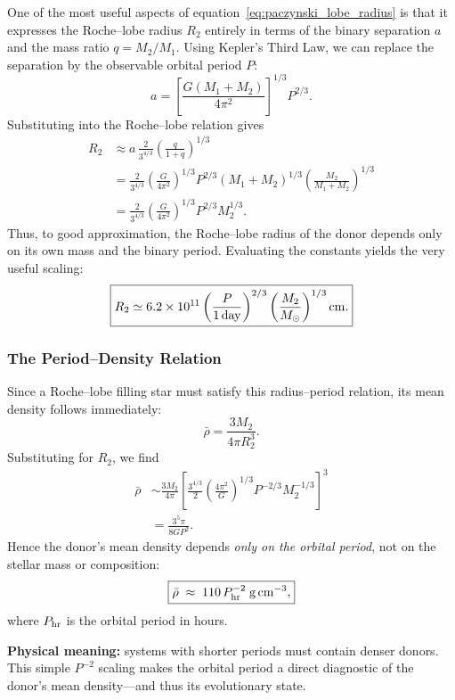 One of the most useful aspects of equation~\eqref{eq:paczynski_lobe_radius} is that it expresses the Roche–lobe radius $R_2$ entirely in terms of the binary separation $a$ and the mass ratio $q = M_2 / M_1$.  
Using Kepler’s Third Law, we can replace the separation by the observable orbital period $P$:
\begin{equation}
a = \left[\frac{G (M_1 + M_2)}{4\pi^2}\right]^{1/3} P^{2/3}.
\end{equation}
Substituting into the Roche–lobe relation gives
\begin{align}
R_2 &\approx a\,\frac{2}{3^{4/3}} \left(\frac{q}{1+q}\right)^{1/3} \\[4pt]
&= \frac{2}{3^{4/3}}\!\left(\frac{G}{4\pi^2}\right)^{1/3}
   P^{2/3} (M_1 + M_2)^{1/3}
   \left(\frac{M_2}{M_1 + M_2}\right)^{1/3} \\[4pt]
&= \frac{2}{3^{4/3}}\!\left(\frac{G}{4\pi^2}\right)^{1/3}
   P^{2/3} M_2^{1/3}.
\end{align}
Thus, to good approximation, the Roche–lobe radius of the donor depends only on its own mass and the binary period.  
Evaluating the constants yields the very useful scaling:
\[
\boxed{
R_2 \simeq 6.2 \times 10^{11}
\left(\frac{P}{{\rm 1\,day}}\right)^{2/3}
\left(\frac{M_2}{M_\odot}\right)^{1/3}
{\rm cm}.
}
\]

\subsubsection{The Period–Density Relation}

Since a Roche–lobe filling star must satisfy this radius–period relation, its mean density follows immediately:
\begin{equation}
\bar{\rho} = \frac{3M_2}{4\pi R_2^3}.
\end{equation}
Substituting for $R_2$, we find
\begin{align}
\bar{\rho} 
   &\sim \frac{3M_2}{4\pi}
      \left[\frac{3^{4/3}}{2}
      \left(\frac{4\pi^2}{G}\right)^{1/3}
      P^{-2/3} M_2^{-1/3}\right]^3 \\[4pt]
   &= \frac{3^5 \pi}{8 G P^2}.
\end{align}
Hence the donor’s mean density depends \emph{only on the orbital period}, not on the stellar mass or composition:
\[
\boxed{
\bar{\rho} \;\approx\; 110\,P_{\rm hr}^{-2}\;{\rm g\,cm^{-3}},
}
\]
where $P_{\rm hr}$ is the orbital period in hours.

\medskip
\noindent
\textbf{Physical meaning:} systems with shorter periods must contain denser donors.  
This simple $P^{-2}$ scaling makes the orbital period a direct diagnostic of the donor’s mean density—and thus its evolutionary state.

